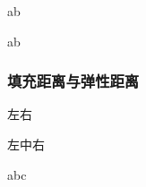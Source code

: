 \documentclass[twoside]{ctexart}
\begin{document}
        
            \newlength{\mylatexlength} %
            \setlength{\mylatexlength}{10pt} %
            \addtolength{\mylatexlength}{-5pt} %
            a\hspace{\mylatexlength}b 

            a\hspace{5pt}b

        \subsubsection{填充距离与弹性距离}
            左\hfill 右

            左中右

        
            a\hrulefill b\dotfill c

            \hrulefill

            \dotfill
            
\end{document}
